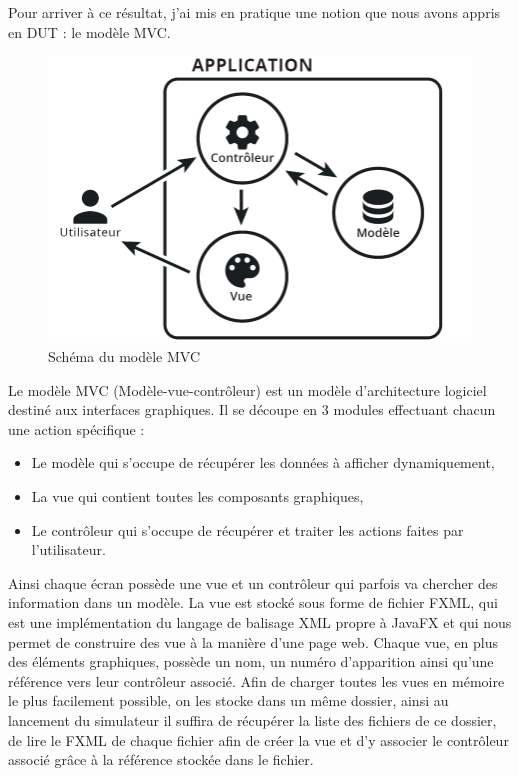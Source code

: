 Pour arriver à ce résultat, j'ai mis en pratique une notion que nous avons appris en DUT : le modèle MVC.
\begin{figure}[h]
	\begin{center}
		\includegraphics[scale=0.70]{partie2/images/mvc.png}
		\caption{Schéma du modèle MVC}
	\end{center}
\end{figure}

Le modèle MVC (Modèle-vue-contrôleur) est un modèle d'architecture logiciel destiné aux interfaces graphiques. Il se découpe en 3 modules effectuant chacun une action spécifique :
\begin{itemize}
	\item Le modèle qui s'occupe de récupérer les données à afficher dynamiquement,
	\item La vue qui contient toutes les composants graphiques,
	\item Le contrôleur qui s'occupe de récupérer et traiter les actions faites par l'utilisateur.\\
\end{itemize}

Ainsi chaque écran possède une vue et un contrôleur qui parfois va chercher des information dans un modèle. La vue est stocké sous forme de fichier FXML, qui est une implémentation du langage de balisage XML propre à JavaFX et qui nous permet de construire des vue à la manière d'une page web. Chaque vue, en plus des éléments graphiques, possède un nom, un numéro d'apparition ainsi qu'une référence vers leur contrôleur associé.
Afin de charger toutes les vues en mémoire le plus facilement possible, on les stocke dans un même dossier, ainsi au lancement du simulateur il suffira de récupérer la liste des fichiers de ce dossier, de lire le FXML de chaque fichier afin de créer la vue et d'y associer le contrôleur associé grâce à la référence stockée dans le fichier.

